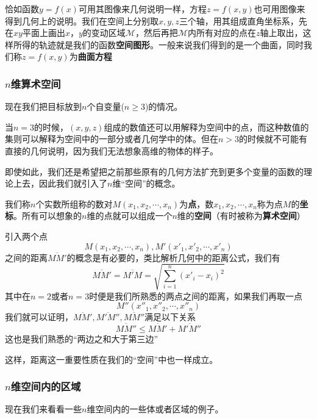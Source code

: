 \documentclass[lang=cn,10pt]{elegantbook}
\begin{document}
恰如函数$y=f(x)$可用其图像来几何说明一样，方程$z=f(x,y)$也可用图像来得到几何上的说明。我们在空间上分别取$x,y,z$三个轴，用其组成直角坐标系，先在$xy$平面上画出$x，y$的变动区域$\mathcal{M}$，然后再把$\mathcal{M}$内所有对应的点在$z$轴上取出，这样所得的轨迹就是我们的函数\textbf{空间图形}。一般来说我们得到的是一个曲面，同时我们称$z=f(x,y)$为\textbf{曲面方程}

\subsubsection{$n$维算术空间}

现在我们把目标放到$n$个自变量($n\ge 3$)的情况。

当$n=3$的时候，$(x,y,z)$组成的数值还可以用解释为空间中的点，而这种数值的集则可以解释为空间中的一部分或者几何学中的体。但在$n>3$的时候就不可能有直接的几何说明，因为我们无法想象高维的物体的样子。

即使如此，我们还是希望把之前那些原有的几何方法扩充到更多个变量的函数的理论上去，因此我们就引入了$n$维“空间”的概念。

我们称$n$个实数所组称的数对$M(x_{1},x_{2},\cdots,x_{n})$为\textbf{点}，数$x_{1},x_{2},\cdots,x_{n}$称为点$M$的\textbf{坐标}。所有可以想象的$n$维的点就可以组成一个$n$维的\textbf{空间}（有时被称为\textbf{算术空间}）

引入两个点
\begin{equation*}
	M(x_{1},x_{2},\cdots,x_{n}),M'(x'_{1},x'_{2},\cdots,x'_{n})
\end{equation*}
之间的距离$\overline{MM'}$的概念是有必要的，类比解析几何中的距离公式，我们有
\begin{equation*}
	\overline{MM'}=\overline{M'M}=\sqrt{\sum_{i=1}^n{\left( x'_i-x_i \right) ^2}}
\end{equation*}
其中在$n=2$或者$n=3$时便是我们所熟悉的两点之间的距离，如果我们再取一点
\begin{equation*}
	M''(x''_{1},x''_{2},\cdots,x''_{n})
\end{equation*}
我们就可以证明，$\overline{MM'},\overline{M'M''},\overline{MM''}$满足以下关系
\begin{equation*}
	\overline{MM''}\le \overline{MM'}+\overline{M'M''}
\end{equation*}
这也是我们熟悉的“两边之和大于第三边”

这样，距离这一重要性质在我们的“空间”中也一样成立。
\subsubsection{$n$维空间内的区域}
现在我们来看看一些$n$维空间内的一些体或者区域的例子。
\end{document}
